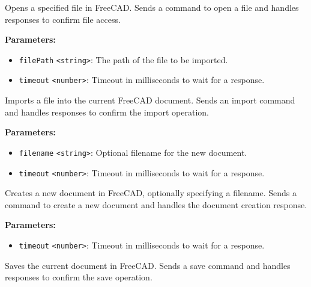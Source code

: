 \documentclass[12pt,a4paper]{article}
\begin{document}
\noindent Opens a specified file in FreeCAD.
Sends a command to open a file and handles responses to confirm file access.

\vspace{5mm}
\noindent {}


\noindent \textbf{Parameters:}
\begin{itemize}
  \item \texttt{filePath} \texttt{<string>}: The path of the file to be imported.
  \item \texttt{timeout} \texttt{<number>}: Timeout in milliseconds to wait for a response.
\end{itemize}

\noindent Imports a file into the current FreeCAD document.
Sends an import command and handles responses to confirm the import operation.

\vspace{5mm}
\noindent {}


\noindent \textbf{Parameters:}
\begin{itemize}
  \item \texttt{filename} \texttt{<string>}: Optional filename for the new document.
  \item \texttt{timeout} \texttt{<number>}: Timeout in milliseconds to wait for a response.
\end{itemize}

\noindent Creates a new document in FreeCAD, optionally specifying a filename.
Sends a command to create a new document and handles the document creation response.

\vspace{5mm}
\noindent {}


\noindent \textbf{Parameters:}
\begin{itemize}
  \item \texttt{timeout} \texttt{<number>}: Timeout in milliseconds to wait for a response.
\end{itemize}

\noindent Saves the current document in FreeCAD.
Sends a save command and handles responses to confirm the save operation.
\end{document}
